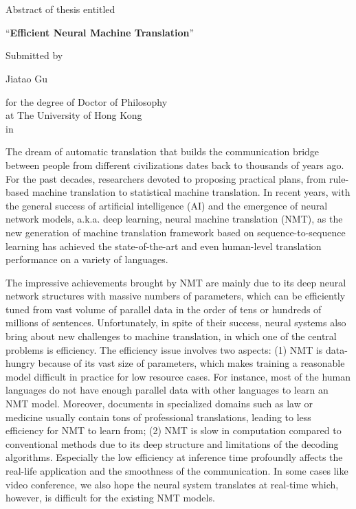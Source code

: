 \chapter*{}

\begin{center}
  \large
  Abstract of thesis entitled            \par
  \Large
  ``{\bf Efficient Neural Machine Translation}''                            \par
  \large
                                         \vspace*{0.2in}
  Submitted by                           \par
  Jiatao Gu                               \par
                                         \vspace*{0.2in}
  for the degree of Doctor of Philosophy \\
  at The University of Hong Kong         \\
  in \printdate
  \end{center}



The dream of automatic translation that builds the communication bridge between people from different civilizations dates back to thousands of years ago. 
For the past decades, researchers devoted to proposing practical plans, from rule-based machine translation to statistical machine translation. 
In recent years, with the general success of artificial intelligence (AI) and the emergence of neural network models, a.k.a. deep learning, neural machine translation (NMT), 
as the new generation of machine translation framework based on sequence-to-sequence learning has achieved the state-of-the-art and even human-level translation performance on a variety of languages.

The impressive achievements brought by NMT are mainly due to its deep neural network structures with massive numbers of parameters, 
which can be efficiently tuned from vast volume of parallel data in the order of tens or hundreds of millions of sentences. 
Unfortunately, in spite of their success, neural systems also bring about new challenges to machine translation, in which one of the central problems is efficiency. 
The efficiency issue involves two aspects: 
(1) NMT is data-hungry because of its vast size of parameters, which makes training a reasonable model difficult in practice for low resource cases. 
For instance, most of the human languages do not have enough parallel data with other languages to learn an NMT model.
Moreover, documents in specialized domains such as law or medicine usually contain tons of professional translations, leading to less efficiency for NMT to learn from;
(2) NMT is slow in computation compared to conventional methods due to its deep structure and limitations of the decoding algorithms. 
Especially the low efficiency at inference time profoundly affects the real-life application and the smoothness of the communication. 
In some cases like video conference, we also hope the neural system translates at real-time which, however, is difficult for the existing NMT models. 


